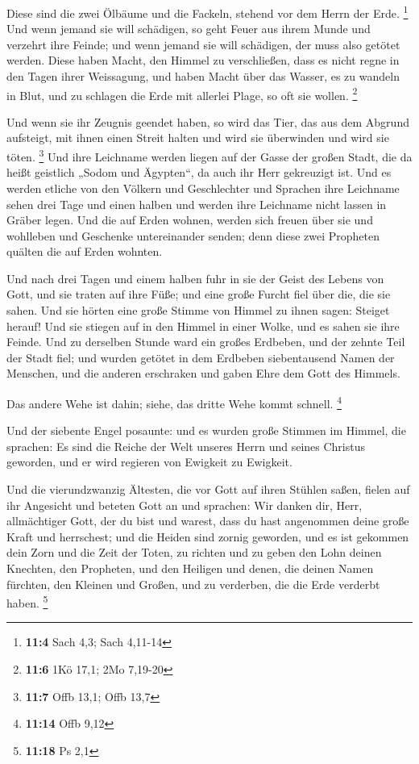  Diese sind die zwei Ölbäume und die Fackeln, stehend vor
dem Herrn der Erde. \footnote{\textbf{11:4} Sach 4,3; Sach 4,11-14}
 Und wenn jemand sie will schädigen, so geht Feuer aus ihrem
Munde und verzehrt ihre Feinde; und wenn jemand sie will schädigen, der
muss also getötet werden.  Diese haben Macht, den Himmel zu
verschließen, dass es nicht regne in den Tagen ihrer Weissagung, und
haben Macht über das Wasser, es zu wandeln in Blut, und zu schlagen die
Erde mit allerlei Plage, so oft sie wollen. \footnote{\textbf{11:6} 1Kö
  17,1; 2Mo 7,19-20}

 Und wenn sie ihr Zeugnis geendet haben, so wird das Tier,
das aus dem Abgrund aufsteigt, mit ihnen einen Streit halten und wird
sie überwinden und wird sie töten. \footnote{\textbf{11:7} Offb 13,1;
  Offb 13,7}  Und ihre Leichname werden liegen auf der Gasse
der großen Stadt, die da heißt geistlich „Sodom und Ägypten``, da auch
ihr Herr gekreuzigt ist.  Und es werden etliche von den
Völkern und Geschlechter und Sprachen ihre Leichname sehen drei Tage und
einen halben und werden ihre Leichname nicht lassen in Gräber legen.
 Und die auf Erden wohnen, werden sich freuen über sie und
wohlleben und Geschenke untereinander senden; denn diese zwei Propheten
quälten die auf Erden wohnten.

 Und nach drei Tagen und einem halben fuhr in sie der Geist
des Lebens von Gott, und sie traten auf ihre Füße; und eine große Furcht
fiel über die, die sie sahen.  Und sie hörten eine große
Stimme von Himmel zu ihnen sagen: Steiget herauf! Und sie stiegen auf in
den Himmel in einer Wolke, und es sahen sie ihre Feinde. 
Und zu derselben Stunde ward ein großes Erdbeben, und der zehnte Teil
der Stadt fiel; und wurden getötet in dem Erdbeben siebentausend Namen
der Menschen, und die anderen erschraken und gaben Ehre dem Gott des
Himmels.

 Das andere Wehe ist dahin; siehe, das dritte Wehe kommt
schnell. \footnote{\textbf{11:14} Offb 9,12}

 Und der siebente Engel posaunte: und es wurden große
Stimmen im Himmel, die sprachen: Es sind die Reiche der Welt unseres
Herrn und seines Christus geworden, und er wird regieren von Ewigkeit zu
Ewigkeit.

 Und die vierundzwanzig Ältesten, die vor Gott auf ihren
Stühlen saßen, fielen auf ihr Angesicht und beteten Gott an
 und sprachen: Wir danken dir, Herr, allmächtiger Gott, der
du bist und warest, dass du hast angenommen deine große Kraft und
herrschest;  und die Heiden sind zornig geworden, und es
ist gekommen dein Zorn und die Zeit der Toten, zu richten und zu geben
den Lohn deinen Knechten, den Propheten, und den Heiligen und denen, die
deinen Namen fürchten, den Kleinen und Großen, und zu verderben, die die
Erde verderbt haben. \footnote{\textbf{11:18} Ps 2,1}

